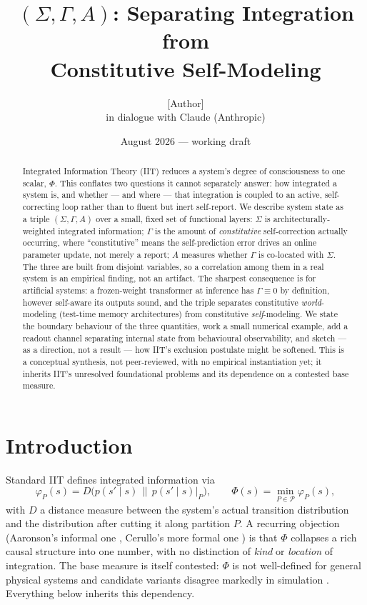 \documentclass[11pt]{article}
\title{\textbf{$(\Sigma,\Gamma,A)$: Separating Integration from\\ Constitutive Self-Modeling}}
\author{[Author]\\ \small in dialogue with Claude (Anthropic)}
\date{August 2026 --- working draft}
\begin{document}
\maketitle

\begin{abstract}
Integrated Information Theory (IIT) reduces a system's degree of consciousness to one scalar, $\Phi$. This conflates two questions it cannot separately answer: how integrated a system is, and whether --- and where --- that integration is coupled to an active, self-correcting loop rather than to fluent but inert self-report. We describe system state as a triple $(\Sigma,\Gamma,A)$ over a small, fixed set of functional layers: $\Sigma$ is architecturally-weighted integrated information; $\Gamma$ is the amount of \emph{constitutive} self-correction actually occurring, where ``constitutive'' means the self-prediction error drives an online parameter update, not merely a report; $A$ measures whether $\Gamma$ is co-located with $\Sigma$. The three are built from disjoint variables, so a correlation among them in a real system is an empirical finding, not an artifact. The sharpest consequence is for artificial systems: a frozen-weight transformer at inference has $\Gamma\equiv0$ by definition, however self-aware its outputs sound, and the triple separates constitutive \emph{world}-modeling (test-time memory architectures) from constitutive \emph{self}-modeling. We state the boundary behaviour of the three quantities, work a small numerical example, add a readout channel separating internal state from behavioural observability, and sketch --- as a direction, not a result --- how IIT's exclusion postulate might be softened. This is a conceptual synthesis, not peer-reviewed, with no empirical instantiation yet; it inherits IIT's unresolved foundational problems and its dependence on a contested base measure.
\end{abstract}

\section{Introduction}

Standard IIT defines integrated information via
\[
\varphi_P(s) = D\big(p(s'\mid s)\,\|\,p(s'\mid s)|_P\big), \qquad \Phi(s) = \min_{P\in\mathcal P}\varphi_P(s),
\]
with $D$ a distance measure between the system's actual transition distribution and the distribution after cutting it along partition $P$. A recurring objection (Aaronson's informal one \cite{aaronson2014}, Cerullo's more formal one \cite{cerullo2015}) is that $\Phi$ collapses a rich causal structure into one number, with no distinction of \emph{kind} or \emph{location} of integration. The base measure is itself contested: $\Phi$ is not well-defined for general physical systems \cite{barrett2019} and candidate variants disagree markedly in simulation \cite{mediano2019}. Everything below inherits this dependency.
\end{document}
